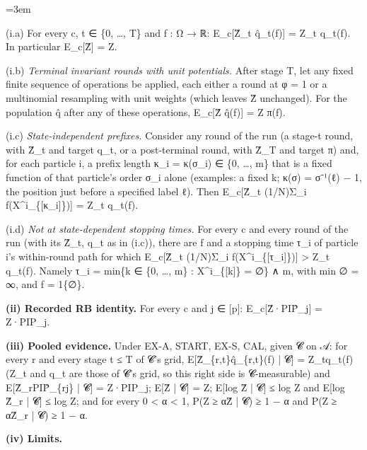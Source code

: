 \documentclass[11pt]{report}
\newenvironment{mdblock}{\begingroup\mdfont\raggedright\setlength{\parindent}{0pt}\setlength{\parskip}{0.55em}\emergencystretch=3em}{\par\endgroup}
\begin{document}
\begin{mdblock}
\begin{mdbul}
\item (i.a) For every c, t ∈ \{0, …, T\} and f : Ω → ℝ: E\_c[Ẑ\_t q̂\_t(f)] = Z\_t q\_t(f). In particular E\_c[Ẑ] = Z.
\item (i.b) \emph{Terminal invariant rounds with unit potentials.} After stage T, let any fixed finite sequence of operations be applied, each either a round at φ = 1 or a multinomial resampling with unit weights (which leaves Ẑ unchanged). For the population q̂ after any of these operations, E\_c[Ẑ q̂(f)] = Z π(f).
\item (i.c) \emph{State-independent prefixes.} Consider any round of the run (a stage-t round, with Ẑ\_t and target q\_t, or a post-terminal round, with Ẑ\_T and target π) and, for each particle i, a prefix length κ\_i = κ(σ\_i) ∈ \{0, …, m\} that is a fixed function of that particle's order σ\_i alone (examples: a fixed k; κ(σ) = σ⁻¹(ℓ) − 1, the position just before a specified label ℓ). Then E\_c[Ẑ\_t (1/N)Σ\_i f(X\textasciicircum{}i\_\{[κ\_i]\})] = Z\_t q\_t(f).
\item (i.d) \emph{Not at state-dependent stopping times.} For every c and every round of the run (with its Ẑ\_t, q\_t as in (i.c)), there are f and a stopping time τ\_i of particle i's within-round path for which E\_c[Ẑ\_t (1/N)Σ\_i f(X\textasciicircum{}i\_\{[τ\_i]\})] > Z\_t q\_t(f). Namely τ\_i = min\{k ∈ \{0, …, m\} : X\textasciicircum{}i\_\{[k]\} = ∅\} ∧ m, with min ∅ = ∞, and f = 1\{∅\}.
\end{mdbul}

\textbf{(ii) Recorded RB identity.} For every c and j ∈ [p]: E\_c[Ẑ·PIP̂\_j] = Z·PIP\_j.

\textbf{(iii) Pooled evidence.} Under EX-A, START, EX-S, CAL, given 𝓒 on 𝒜: for every r and every stage t ≤ T of 𝓒's grid, E[Ẑ\_\{r,t\}q̂\_\{r,t\}(f) | 𝓒] = Z\_tq\_t(f) (Z\_t and q\_t are those of 𝓒's grid, so this right side is 𝓒-measurable) and E[Ẑ\_rPIP̂\_\{rj\} | 𝓒] = Z·PIP\_j; E[Ẑ | 𝓒] = Z; E[log Ẑ | 𝓒] ≤ log Z and E[log Ẑ\_r | 𝓒] ≤ log Z; and for every 0 < α < 1, P(Z ≥ αẐ | 𝓒) ≥ 1 − α and P(Z ≥ αẐ\_r | 𝓒) ≥ 1 − α.

\textbf{(iv) Limits.}


\end{mdblock}
\end{document}
